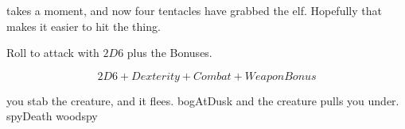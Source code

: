 takes a moment, and now four tentacles have grabbed the elf.
Hopefully that makes it easier to hit the thing.

Roll to attack with $2D6$ plus the Bonuses.

$$2D6 + Dexterity + Combat + Weapon Bonus$$

\begin{selectPath}
  {you stab the creature, and it flees.}%
  {bogAtDusk}
  {and the creature pulls you under.}%
  {spyDeath} \gls{woodspy}
\end{selectPath}
